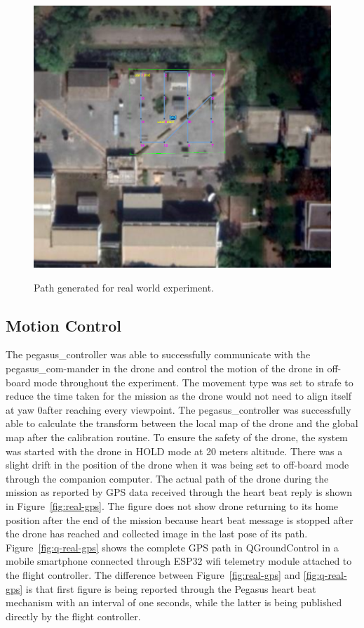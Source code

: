 \begin{figure}
	\centering
	\caption[Path generated for real world experiment.]{\small Path generated for real world experiment.} 
	\includegraphics[width=5in]{figures/experiment/real_mapviz_plan}
	\label{fig:real-path}
\end{figure}

\subsection{Motion Control}
The pegasus\_controller was able to successfully communicate with the pegasus\_com-mander in the drone and control the motion of the drone in off-board mode throughout the experiment. The movement type was set to strafe to reduce the time taken for the mission as the drone would not need to align itself at yaw 0\degree after reaching every viewpoint. The pegasus\_controller was successfully able to calculate the transform between the local map of the drone and the global map after the calibration routine. To ensure the safety of the drone, the system was started with the drone in HOLD mode at 20 meters altitude. There was a slight drift in the position of the drone when it was being set to off-board mode through the companion computer. The actual path of the drone during the mission as reported by GPS data received through the heart beat reply is shown in Figure~\ref{fig:real-gps}. The figure does not show drone returning to its home position after the end of the mission because heart beat message is stopped after the drone has reached and collected image in the last pose of its path. Figure~\ref{fig:q-real-gps} shows the complete GPS path in QGroundControl in a mobile smartphone connected through ESP32 wifi telemetry module attached to the flight controller. The difference between Figure~\ref{fig:real-gps} and \ref{fig:q-real-gps} is that first figure is being reported through the Pegasus heart beat mechanism with an interval of one seconds, while the latter is being published directly by the flight controller.


